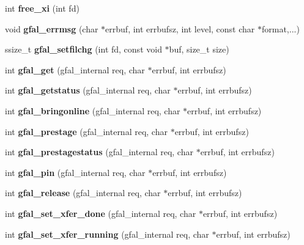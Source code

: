 \begin{CompactItemize}
\item 
int \textbf{free\_\-xi} (int fd)\label{gfal__common_8c_661514301effed3ed470e6ece13fffaa}

\item 
void \textbf{gfal\_\-errmsg} (char $\ast$errbuf, int errbufsz, int level, const char $\ast$format,...)\label{gfal__common_8c_e6fb0cae56e9344c2b6ed23001f7dcb5}

\item 
ssize\_\-t \textbf{gfal\_\-setfilchg} (int fd, const void $\ast$buf, size\_\-t size)\label{group__posix__group_g45a23756f2c79a7e07488bb3fb2fc35e}

\item 
int \textbf{gfal\_\-get} (gfal\_\-internal req, char $\ast$errbuf, int errbufsz)\label{gfal__common_8c_95e09a3cfbab50249ecf2bca54b88274}

\item 
int \textbf{gfal\_\-getstatus} (gfal\_\-internal req, char $\ast$errbuf, int errbufsz)\label{gfal__common_8c_2665d19dee3b8ed312f27d97310dd21d}

\item 
int \textbf{gfal\_\-bringonline} (gfal\_\-internal req, char $\ast$errbuf, int errbufsz)\label{gfal__common_8c_dafd89750e4d0a86149e95cfab51586a}

\item 
int \textbf{gfal\_\-prestage} (gfal\_\-internal req, char $\ast$errbuf, int errbufsz)\label{gfal__common_8c_ec2097ecb2aadb209c713a9c2b1d4384}

\item 
int \textbf{gfal\_\-prestagestatus} (gfal\_\-internal req, char $\ast$errbuf, int errbufsz)\label{gfal__common_8c_64e77a525710c0ffd5def90f8aef3f8a}

\item 
int \textbf{gfal\_\-pin} (gfal\_\-internal req, char $\ast$errbuf, int errbufsz)\label{gfal__common_8c_b149b326996828f815afc9f004057ec1}

\item 
int \textbf{gfal\_\-release} (gfal\_\-internal req, char $\ast$errbuf, int errbufsz)\label{gfal__common_8c_229fde0a465692ab8b0ed3fec2ebc29a}

\item 
int \textbf{gfal\_\-set\_\-xfer\_\-done} (gfal\_\-internal req, char $\ast$errbuf, int errbufsz)\label{gfal__common_8c_946427a964fb84234ace8d3a2fdc29f3}

\item 
int \textbf{gfal\_\-set\_\-xfer\_\-running} (gfal\_\-internal req, char $\ast$errbuf, int errbufsz)\label{gfal__common_8c_25eed083011cdc1cb50910548ff69c8e}


\end{CompactItemize}
